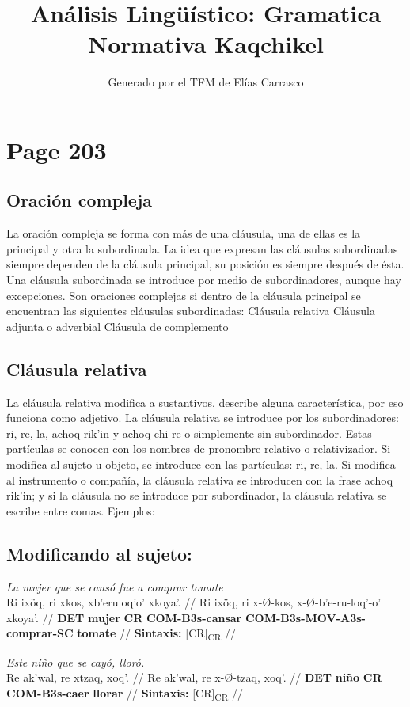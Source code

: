 \documentclass{article}%
\title{Análisis Lingüístico: Gramatica Normativa Kaqchikel}%
\author{Generado por el TFM de Elías Carrasco}%
\begin{document}
%
\normalsize%
\maketitle%
\section{Page 203}%
\label{sec:Page203}%
\subsection{Oración compleja}%
\label{subsec:Oracincompleja}%

%
La oración compleja se forma con más de una cláusula, una de ellas es la principal y %
otra la subordinada. La idea que expresan las cláusulas subordinadas siempre dependen %
de la cláusula principal, su posición es siempre después de ésta. Una cláusula subordinada %
se introduce por medio de subordinadores, aunque hay excepciones. Son oraciones %
complejas si dentro de la cláusula principal se encuentran las siguientes cláusulas %
subordinadas: %
Cláusula relativa %
Cláusula adjunta o adverbial %
Cláusula de complemento %
\subsection{Cláusula relativa}%
\label{subsec:Clusularelativa}%

%
La cláusula relativa modifica a sustantivos, describe alguna característica, por eso %
funciona como adjetivo. La cláusula relativa se introduce por los subordinadores: ri, %
re, la, achoq rik’in y achoq chi re o simplemente sin subordinador. Estas partículas se %
conocen con los nombres de pronombre relativo o relativizador. Si modifica al sujeto u %
objeto, se introduce con las partículas: ri, re, la. Si modifica al instrumento o compañía, %
la cláusula relativa se introducen con la frase achoq rik’in; y si la cláusula no se %
introduce por subordinador, la cláusula relativa se escribe entre comas. Ejemplos: %
\subsection{Modificando al sujeto:}%
\label{subsec:Modificandoalsujeto}%

%
\par\medskip%
\ex
\textit{La mujer que se cansó fue a comprar tomate} \\
\begingl
\gla Ri ixöq, ri xkos, xb'eruloq'o' xkoya'. //
\glb Ri ixöq, ri x-Ø-kos, x-Ø-b'e-ru-loq'-o' xkoya'. //
\glc \textbf{DET} \textbf{mujer} \textbf{CR} \textbf{COM-}\textbf{B3s-}\textbf{cansar} \textbf{COM-}\textbf{B3s-}\textbf{MOV-}\textbf{A3s-}\textbf{comprar-}\textbf{SC} \textbf{tomate} //
\glft \textbf{Sintaxis:} [CR]\textsubscript{CR} //
\endgl
\xe
%
\medskip%
\par\medskip%
\ex
\textit{Este niño que se cayó, lloró.} \\
\begingl
\gla Re ak'wal, re xtzaq, xoq'. //
\glb Re ak'wal, re x-Ø-tzaq, xoq'. //
\glc \textbf{DET} \textbf{niño} \textbf{CR} \textbf{COM-}\textbf{B3s-}\textbf{caer} \textbf{llorar} //
\glft \textbf{Sintaxis:} [CR]\textsubscript{CR} //
\endgl
\xe
%
\medskip

%
\end{document}
